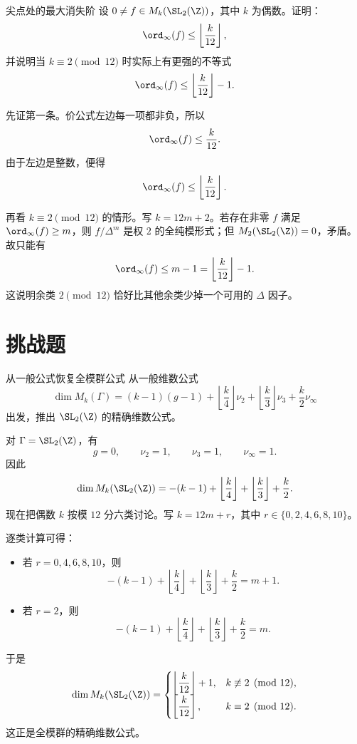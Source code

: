 \begin{problem}{尖点处的最大消失阶}
\medium
设 $0\ne f\in M_k(\SL_2(\Z))$，其中 $k$ 为偶数。证明：
\[
\ord_\infty(f)\le \left\lfloor\frac{k}{12}\right\rfloor,
\]
并说明当 $k\equiv 2\pmod{12}$ 时实际上有更强的不等式
\[
\ord_\infty(f)\le \left\lfloor\frac{k}{12}\right\rfloor-1.
\]
\end{problem}
\begin{solution}
先证第一条。价公式左边每一项都非负，所以
\[
\ord_\infty(f)\le \frac{k}{12}.
\]
由于左边是整数，便得
\[
\ord_\infty(f)\le \left\lfloor\frac{k}{12}\right\rfloor.
\]

再看 $k\equiv 2\pmod{12}$ 的情形。写 $k=12m+2$。若存在非零 $f$ 满足 $\ord_\infty(f)\ge m$，则 $f/\Delta^m$ 是权 $2$ 的全纯模形式；但 $M_2(\SL_2(\Z))=0$，矛盾。故只能有
\[
\ord_\infty(f)\le m-1=\left\lfloor\frac{k}{12}\right\rfloor-1.
\]
这说明余类 $2\pmod{12}$ 恰好比其他余类少掉一个可用的 $\Delta$ 因子。
\end{solution}

\section{挑战题 \hard}

\begin{problem}{从一般公式恢复全模群公式}
\hard
从一般维数公式
\[
\dim M_k(\Gamma)=(k-1)(g-1)+\left\lfloor\frac{k}{4}\right\rfloor\nu_2+
\left\lfloor\frac{k}{3}\right\rfloor\nu_3+\frac{k}{2}\nu_\infty
\]
出发，推出 $\SL_2(\Z)$ 的精确维数公式。
\end{problem}
\begin{solution}
对 $\Gamma=\SL_2(\Z)$，有
\[
g=0,
\qquad
\nu_2=1,
\qquad
\nu_3=1,
\qquad
\nu_\infty=1.
\]
因此
\[
\dim M_k(\SL_2(\Z))=-(k-1)+\left\lfloor\frac{k}{4}\right\rfloor+
\left\lfloor\frac{k}{3}\right\rfloor+\frac{k}{2}.
\]
现在把偶数 $k$ 按模 $12$ 分六类讨论。写 $k=12m+r$，其中
$r\in\{0,2,4,6,8,10\}$。

逐类计算可得：
\begin{itemize}
  \item 若 $r=0,4,6,8,10$，则
  \[
  -(k-1)+\left\lfloor\frac{k}{4}\right\rfloor+
  \left\lfloor\frac{k}{3}\right\rfloor+\frac{k}{2}=m+1.
  \]
  \item 若 $r=2$，则
  \[
  -(k-1)+\left\lfloor\frac{k}{4}\right\rfloor+
  \left\lfloor\frac{k}{3}\right\rfloor+\frac{k}{2}=m.
  \]
\end{itemize}
于是
\[
\dim M_k(\SL_2(\Z))=
\begin{cases}
\left\lfloor\dfrac{k}{12}\right\rfloor+1,&k\not\equiv 2\pmod{12},\\
\left\lfloor\dfrac{k}{12}\right\rfloor,&k\equiv 2\pmod{12}.
\end{cases}
\]
这正是全模群的精确维数公式。
\end{solution}

